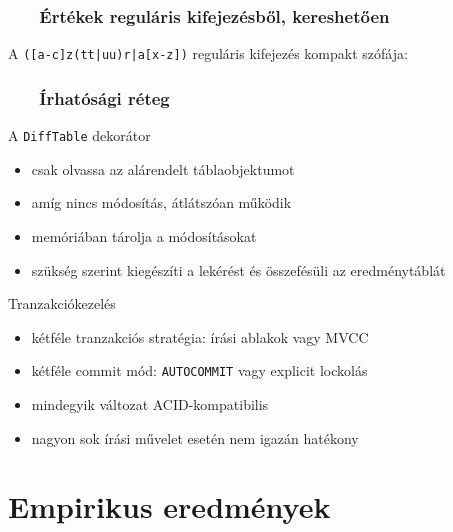 \documentclass[
    aspectratio=169,
]{beamer}
\newcommand{\slidetitle}[2]{\frametitle{{\small #1 ~ \ding{226} ~ } \normalsize \textbf{#2} }}
\begin{document}
\begin{frame}[t,noframenumbering]
    \slidetitle{\sectionshorttitle}{Értékek reguláris kifejezésből, kereshetően}
    \centering
    {\Large A \texttt{\colorbox{Goldenrod!10}{([a-c]z(tt|uu)r|a[x-z])}} reguláris kifejezés {\color{red}kompakt} szófája:}
    
    \vspace{1.2cm}
    
    
\end{frame}

\begin{frame}
    \slidetitle{\sectionshorttitle}{Írhatósági réteg}
    
    {\color{beamer@blendedblue}A \texttt{DiffTable} dekorátor}
    
    \begin{itemize}
        \item csak olvassa az alárendelt táblaobjektumot
        \item amíg nincs módosítás, átlátszóan működik
        \item memóriában tárolja a módosításokat
        \item szükség szerint kiegészíti a lekérést és összefésüli az eredménytáblát
    \end{itemize}
    
    \vspace{0.4cm}
    
    {\color{beamer@blendedblue}Tranzakciókezelés}
    
    \begin{itemize}
        \item kétféle tranzakciós stratégia: írási ablakok vagy MVCC
        \item kétféle commit mód: \texttt{AUTOCOMMIT} vagy explicit lockolás
        \item mindegyik változat ACID-kompatibilis
        \item nagyon sok írási művelet esetén nem igazán hatékony
    \end{itemize}
\end{frame}

\section{Empirikus eredmények}
\def\sectionshorttitle{Eredmények}
\end{document}

